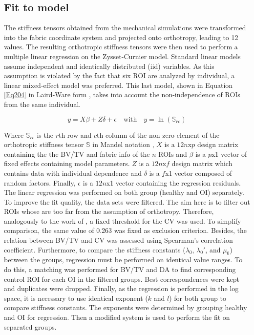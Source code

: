 \documentclass[a4paper,fleqn]{DC_ArtStyle}
\begin{document}
\subsection{Fit to model}
The stiffness tensors obtained from the mechanical simulations were transformed into the fabric coordinate system and projected onto orthotropy, leading to 12 values. The resulting orthotropic stiffness tensors were then used to perform a multiple linear regression on the Zysset-Curnier model. Standard linear models assume independent and identically distributed (iid) variables. As this assumption is violated by the fact that six ROI are analyzed by individual, a linear mixed-effect model was preferred. This last model, shown in Equation \ref{Eq204} in Laird-Ware form \cite{Laird1982}, takes into account the non-independence of ROIs from the same individual. 

\begin{equation}
	y = X \beta + Z \delta + \epsilon \quad \text{with} \quad y = \ln(\mathbb{S}_{rc})
	\label{Eq204}
\end{equation}

Where $\mathbb{S}_{rc}$ is the $r$th row and $c$th column of the non-zero element of the orthotropic stiffness tensor $\mathbb{S}$ in Mandel notation \cite{MANDEL1965}, $X$ is a $12n$x$p$ design matrix containing the the BV/TV and fabric info of the $n$ ROIs and $\beta$ is a $p$x1 vector of fixed effects containing model parameters. $Z$ is a $12n$x$f$ design matrix which contains data with individual dependence and $\delta$ is a $f$x1 vector composed of random factors. Finally, $\epsilon$ is a $12n$x1 vector containing the regression residuals.\\

The linear regression was performed on both group (healthy and OI) separately. To improve the fit quality, the data sets were filtered. The aim here is to filter out ROIs whose are too far from the assumption of orthotropy. Therefore, analogously to the work of \cite{Panyasantisuk2015}, a fixed threshold for the CV was used. To simplify comparison, the same value of 0.263 was fixed as exclusion criterion. Besides, the relation between BV/TV and CV was assessed using Spearman's correlation coefficient. Furthermore, to compare the stiffness constants ($\lambda_0$, $\lambda_0'$, and $\mu_0$) between the groups, regression must be performed on identical value ranges. To do this, a matching was performed for BV/TV and DA to find corresponding control ROI for each OI in the filtered groups. Best correspondences were kept and duplicates were dropped. Finally, as the regression is performed in the log space, it is necessary to use identical exponent ($k$ and $l$) for both group to compare stiffness constants. The exponents were determined by grouping healthy and OI for regression. Then a modified system is used to perform the fit on separated groups.\\
\end{document}
